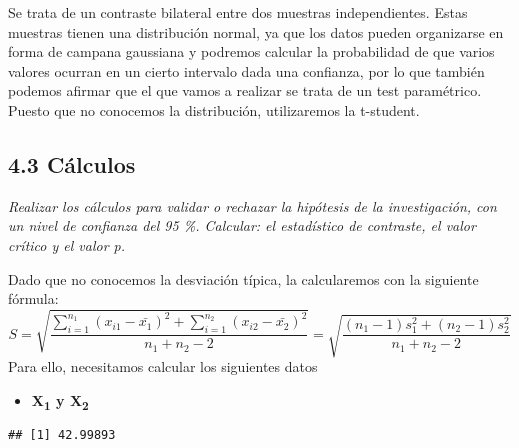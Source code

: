 \documentclass[
]{article}
\newenvironment{Shaded}{\begin{snugshade}}{\end{snugshade}}
\newcommand{\KeywordTok}[1]{\textcolor[rgb]{0.13,0.29,0.53}{\textbf{#1}}}
\newcommand{\NormalTok}[1]{#1}
\newcommand{\OperatorTok}[1]{\textcolor[rgb]{0.81,0.36,0.00}{\textbf{#1}}}
\newcommand{\StringTok}[1]{\textcolor[rgb]{0.31,0.60,0.02}{#1}}
\providecommand{\tightlist}{%
  \setlength{\itemsep}{0pt}\setlength{\parskip}{0pt}}
\begin{document}
Se trata de un contraste bilateral entre dos muestras independientes.
Estas muestras tienen una distribución normal, ya que los datos pueden
organizarse en forma de campana gaussiana y podremos calcular la
probabilidad de que varios valores ocurran en un cierto intervalo dada
una confianza, por lo que también podemos afirmar que el que vamos a
realizar se trata de un test paramétrico. Puesto que no conocemos la
distribución, utilizaremos la t-student.

\hypertarget{cuxe1lculos-1}{%
\subsection{4.3 Cálculos}\label{cuxe1lculos-1}}

\emph{Realizar los cálculos para validar o rechazar la hipótesis de la
investigación, con un nivel de confianza del 95 \%. Calcular: el
estadístico de contraste, el valor crítico y el valor p.}

Dado que no conocemos la desviación típica, la calcularemos con la
siguiente fórmula:
\[S= \sqrt{\frac{\sum_{i = 1}^{n_{1}}(x_{i1} - \bar{x_1})^2 + \sum_{i = 1}^{n_{2}}(x_{i2} - \bar{x_2})^2}{n_{1} + n_{2} - 2}} = \sqrt{\frac{(n_{1} - 1)s_{1}^2 + (n_{2} - 1)s_{2}^2}{n_{1} + n_{2} - 2}}\]
Para ello, necesitamos calcular los siguientes datos

\begin{itemize}
\tightlist
\item
  \textbf{X\textsubscript{1} y X\textsubscript{2}}
\end{itemize}

\begin{Shaded}
\end{Shaded}

\begin{verbatim}
## [1] 42.99893
\end{verbatim}

\begin{Shaded}
\end{Shaded}
\end{document}
